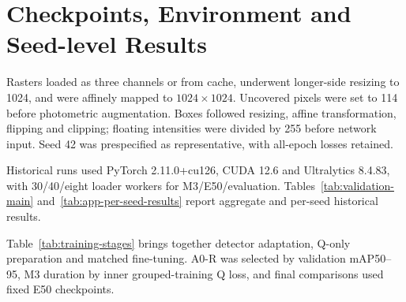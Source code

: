 \section{Checkpoints, Environment and Seed-level Results}
\label{app:checkpoint-environment}

Rasters loaded as three channels or from cache, underwent longer-side resizing to 1024, and were affinely mapped to $1024\times1024$. Uncovered pixels were set to 114 before photometric augmentation. Boxes followed resizing, affine transformation, flipping and clipping; floating intensities were divided by 255 before network input. Seed 42 was prespecified as representative, with all-epoch losses retained.



Historical runs used PyTorch 2.11.0+cu126, CUDA 12.6 and Ultralytics 8.4.83, with 30/40/eight loader workers for M3/E50/evaluation. Tables~\ref{tab:validation-main} and~\ref{tab:app-per-seed-results} report aggregate and per-seed historical results.

Table~\ref{tab:training-stages} brings together detector adaptation, Q-only preparation and matched fine-tuning. A0-R was selected by validation mAP50--95, M3 duration by inner grouped-training Q loss, and final comparisons used fixed E50 checkpoints.


